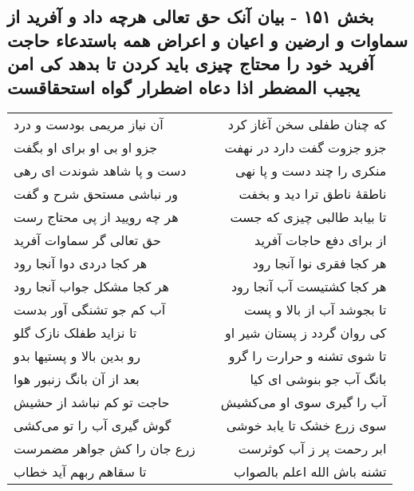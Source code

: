 \begin{center}
\section*{بخش ۱۵۱ - بیان آنک حق تعالی هرچه داد و آفرید از سماوات و ارضین و اعیان و اعراض همه باستدعاء حاجت آفرید خود را محتاج چیزی باید کردن تا بدهد کی امن یجیب المضطر اذا دعاه اضطرار گواه استحقاقست}
\label{sec:sh151}
\begin{longtable}{l p{0.5cm} r}
آن نیاز مریمی بودست و درد
&&
که چنان طفلی سخن آغاز کرد
\\
جزو او بی او برای او بگفت
&&
جزو جزوت گفت دارد در نهفت
\\
دست و پا شاهد شوندت ای رهی
&&
منکری را چند دست و پا نهی
\\
ور نباشی مستحق شرح و گفت
&&
ناطقهٔ ناطق ترا دید و بخفت
\\
هر چه رویید از پی محتاج رست
&&
تا بیابد طالبی چیزی که جست
\\
حق تعالی گر سماوات آفرید
&&
از برای دفع حاجات آفرید
\\
هر کجا دردی دوا آنجا رود
&&
هر کجا فقری نوا آنجا رود
\\
هر کجا مشکل جواب آنجا رود
&&
هر کجا کشتیست آب آنجا رود
\\
آب کم جو تشنگی آور بدست
&&
تا بجوشد آب از بالا و پست
\\
تا نزاید طفلک نازک گلو
&&
کی روان گردد ز پستان شیر او
\\
رو بدین بالا و پستیها بدو
&&
تا شوی تشنه و حرارت را گرو
\\
بعد از آن بانگ زنبور هوا
&&
بانگ آب جو بنوشی ای کیا
\\
حاجت تو کم نباشد از حشیش
&&
آب را گیری سوی او می‌کشیش
\\
گوش گیری آب را تو می‌کشی
&&
سوی زرع خشک تا یابد خوشی
\\
زرع جان را کش جواهر مضمرست
&&
ابر رحمت پر ز آب کوثرست
\\
تا سقاهم ربهم آید خطاب
&&
تشنه باش الله اعلم بالصواب
\\
\end{longtable}
\end{center}
